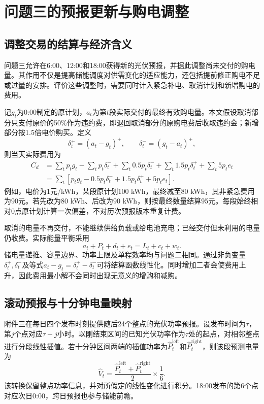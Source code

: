 \section{问题三的预报更新与购电调整}
\subsection{调整交易的结算与经济含义}
问题三允许在6:00、12:00和18:00获得新的光伏预报，并据此调整尚未交付的购电量。其作用不仅是提高储能调度对供需变化的适应能力，还包括提前修正购电不足或过量的安排。评价这些调整时，需要同时计入紧急补电、取消计划和新增购电的费用。

记$g_t$为0:00制定的原计划，$a_t$为第$t$段实际交付的最终有效购电量。本文假设取消部分只支付原价的50\%作为违约费，即退回取消部分的原购电费后收取违约金；新增部分按1.5倍电价购买。定义
\begin{equation}
\delta_t^+=(a_t-g_t)^+,\qquad \delta_t^-=(g_t-a_t)^+,
\end{equation}
则当天实际费用为
\begin{align}
C_d&=\sum_t p_tg_t-\sum_t p_t\delta_t^-+\sum_t0.5p_t\delta_t^-
       +\sum_t1.5p_t\delta_t^++\sum_t5p_te_t\\
&=\sum_t\left[p_tg_t-0.5p_t\delta_t^-+1.5p_t\delta_t^++5p_te_t\right].
\end{align}
例如，电价为1元/kWh，某段原计划100 kWh，最终减至80 kWh，其非紧急费用为90元。若先改为80 kWh、后改为90 kWh，则按最终数量结算95元。每段始终相对0点原计划计算一次偏差，不对历次预报版本重复计费。

取消的电量不再交付，不能继续供给负载或给电池充电；已经交付但未利用的电量仍收费。实际能量平衡采用
\begin{equation}
a_t+P_t+d_t+e_t=L_t+c_t+w_t.
\end{equation}
储电量递推、容量边界、功率上限及单程效率均与问题二相同。通过非负变量$\delta_t^+,\delta_t^-$及等式$a_t-g_t=\delta_t^+-\delta_t^-$可将结算函数线性化。同时增加二者会使费用上升，因此费用最小解不会同时出现无意义的增购和减购。

\subsection{滚动预报与十分钟电量映射}
附件三在每日四个发布时刻提供随后24个整点的光伏功率预报。设发布时间为$\tau$，第$j$个点对应$\tau+j$小时。以刚结束区间的已知光伏功率作为$\tau$处的起点，对相邻整点进行分段线性插值。若十分钟区间两端的插值功率为$\widehat P_t^{\mathrm{left}}$和$\widehat P_t^{\mathrm{right}}$，则该段预测电量为
\begin{equation}
\widehat V_t=\frac{\widehat P_t^{\mathrm{left}}+\widehat P_t^{\mathrm{right}}}{2}\times\frac{1}{6}.
\end{equation}
该转换保留整点功率信息，并对所假定的线性变化进行积分。18:00发布的第6个点对应次日0:00，跨日预报也参与储能前瞻。


